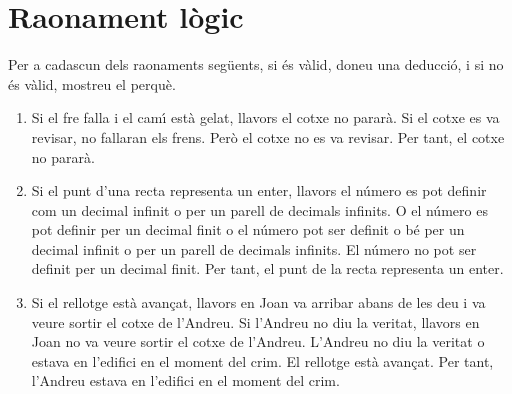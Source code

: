 \section{Raonament l\`{o}gic}

\begin{exer}
Per a cadascun dels raonaments seg\"{u}ents, si \'{e}s v\`{a}lid, doneu una
deducci\'{o}, i si no \'{e}s v\`{a}lid, mostreu el perqu\`{e}.

\begin{enumerate}
\item Si el fre falla i el cam\'{\i} est\`{a} gelat, llavors el cotxe no
parar\`{a}. Si el cotxe es va revisar, no fallaran els frens. Per\`{o} el
cotxe no es va revisar. Per tant, el cotxe no parar\`{a}.

\item Si el punt d'una recta representa un enter, llavors el n\'{u}mero es pot
definir com un decimal infinit o per un parell de decimals infinits. O el
n\'{u}mero es pot definir per un decimal finit o el n\'{u}mero pot ser definit
o b\'{e} per un decimal infinit o per un parell de decimals infinits. El
n\'{u}mero no pot ser definit per un decimal finit. Per tant, el punt de la
recta representa un enter.

\item Si el rellotge est\`{a} avan\c{c}at, llavors en Joan va arribar abans de
les deu i va veure sortir el cotxe de l'Andreu. Si l'Andreu no diu la veritat,
llavors en Joan no va veure sortir el cotxe de l'Andreu. L'Andreu no diu la
veritat o estava en l'edifici en el moment del crim. El rellotge est\`{a}
avan\c{c}at. Per tant, l'Andreu estava en l'edifici en el moment del crim.
\end{enumerate}
\end{exer}

